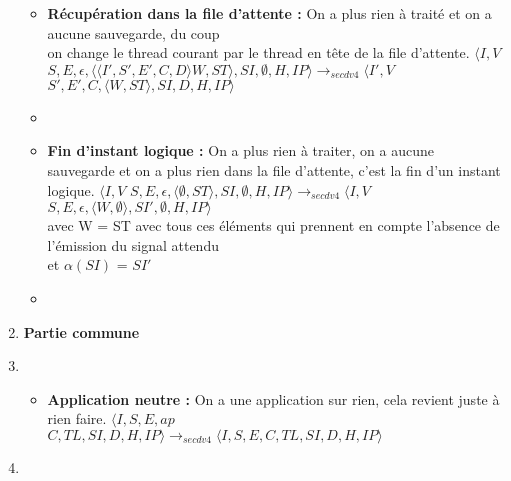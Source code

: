 \documentclass[10pt,a4paper]{article}
\begin{document}
\begin{enumerate}
\begin{itemize}
					\item[] \textbf{Récupération dans la file d'attente :} On a plus rien à traité et on a aucune sauvegarde, du coup 
					\\on change le thread courant par le thread en tête de la file d'attente.
					\smallbreak
					$\langle I,V$ $S,E,\epsilon,\langle\langle I',S',E',C,D\rangle W,ST\rangle,SI,\emptyset,H,IP\rangle 
					\longrightarrow_{secdv4} \langle I',V$ $S',E',C,\langle W,ST\rangle,SI,D,H,IP\rangle$
					\item[]
					
					\item[] \textbf{Fin d'instant logique :} On a plus rien à traiter, on a aucune sauvegarde et on a plus rien dans la file d'attente, c'est la fin d'un instant logique.
					\smallbreak
					$\langle I,V$ $S,E,\epsilon,\langle\emptyset,ST\rangle,SI,\emptyset,H,IP\rangle 
					\longrightarrow_{secdv4} \langle I,V$ $S,E,\epsilon,\langle W,\emptyset\rangle,SI',\emptyset,H,IP\rangle$\\
					avec W = ST avec tous ces éléments qui prennent en compte l'absence de l'émission du signal attendu
					\\et  $\alpha(SI)$ = $SI'$ 
					\item[]
					
				\end{itemize}
				\item[] \textbf{Partie commune} 
				\item[]
				\begin{itemize}
					\item[] \textbf{Application neutre :} On a une application sur rien, cela revient juste à rien faire.
					\smallbreak 
					$\langle I,S,E,ap$ $C,TL,SI,D,H,IP\rangle
					\longrightarrow_{secdv4} \langle I,S,E,C,TL,SI,D,H,IP\rangle$
				\end{itemize}
				
				\item[]
			\end{enumerate}
			\bigbreak
			\bigbreak
			
\end{document}
